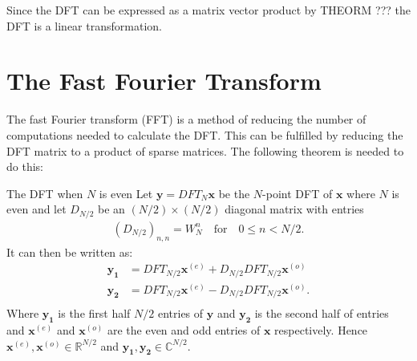 Since the DFT can be expressed as a matrix vector product by THEORM ??? the DFT is a linear transformation.

\section{The Fast Fourier Transform}
The fast Fourier transform (FFT) is a method of reducing the number of computations needed to calculate the DFT. This can be fulfilled by reducing the DFT matrix to a product of sparse matrices. 
The following theorem is needed to do this:
\begin{theorem}{The DFT when $N$ is even}
    Let $\mathbf{y}=DFT_{N}\mathbf{x}$ be the $N$-point DFT of $\mathbf{x}$ where $N$ is even and let $D_{N/2}$ be an $(N/2)\times(N/2)$ diagonal matrix with entries 
    \begin{align}
        (D_{N/2})_{n,n}=W_N^n \quad \text{for} \quad 0 \leq n< N/2.
        \label{eq:DFTDiagonal}
    \end{align}
    It can then be written as:
    \begin{align*}
         \mathbf{y_1}&=DFT_{N/2}\mathbf{x}^{(e)}+D_{N/2}DFT_{N/2}\mathbf{x}^{(o)}\\ 
         \mathbf{y_2}&=DFT_{N/2}\mathbf{x}^{(e)}-D_{N/2}DFT_{N/2}\mathbf{x}^{(o)}.\\
    \end{align*}
    Where $\mathbf{y_1}$ is the first half $N/2$ entries of $\mathbf{y}$ and $\mathbf{y_2}$ is the second half of entries and $\mathbf{x}^{(e)}$ and $\mathbf{x}^{(o)}$ are the even and odd entries of $\mathbf{x}$ respectively. Hence $\mathbf{x}^{(e)},\mathbf{x}^{(o)}\in \mathds{R}^{N/2}$ and $\mathbf{y_1},\mathbf{y_2}\in \mathds{C}^{N/2}$. \cite[67]{ryan2019linear}
\end{theorem}
